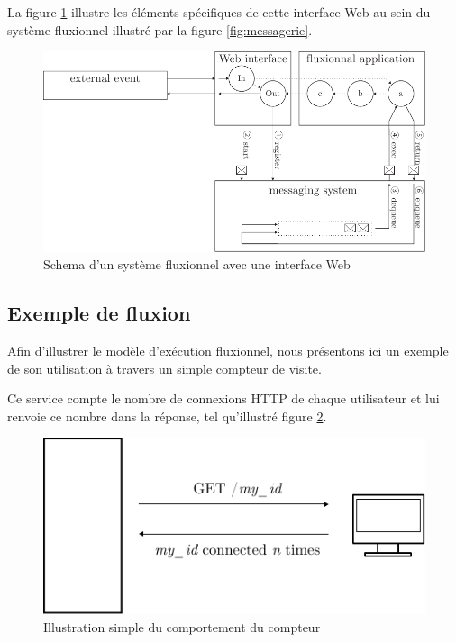 La figure \ref{fig:schemaweb} illustre les éléments spécifiques de cette interface Web au sein du système fluxionnel illustré par la figure \ref{fig:messagerie}.

\begin{figure}[h!]
	\includegraphics[width=\linewidth]{schema-web.pdf}
	\caption{Schema d'un système fluxionnel avec une interface Web}
	\label{fig:schemaweb}
\end{figure}


\subsection{Exemple de fluxion}

Afin d'illustrer le modèle d'exécution fluxionnel, nous présentons ici un exemple de son utilisation à travers un simple compteur de visite.

Ce service compte le nombre de connexions HTTP de chaque utilisateur et lui renvoie ce nombre dans la réponse, tel qu'illustré figure \ref{fig:example}.

\begin{figure}[h!]
  \includegraphics[width=\linewidth]{count.pdf}
  \caption{Illustration simple du comportement du compteur}
  \label{fig:example}
\end{figure}


